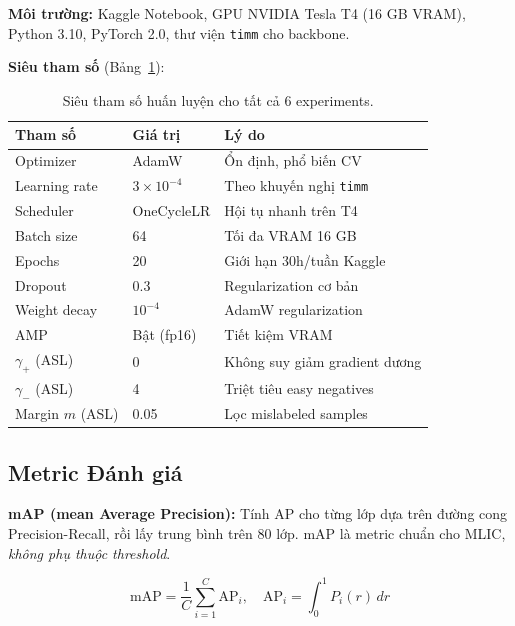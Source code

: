\documentclass[conference]{IEEEtran}
\begin{document}
\textbf{Môi trường:} Kaggle Notebook, GPU NVIDIA Tesla T4 (16 GB VRAM),
Python 3.10, PyTorch 2.0, thư viện \texttt{timm} cho backbone.

\textbf{Siêu tham số} (Bảng~\ref{tab:hyperparams}):

\begin{table}[t]
  \caption{Siêu tham số huấn luyện cho tất cả 6 experiments.}
  \label{tab:hyperparams}
  \centering
  \begin{tabular}{lll}
    \toprule
    \textbf{Tham số} & \textbf{Giá trị} & \textbf{Lý do} \\
    \midrule
    Optimizer        & AdamW            & Ổn định, phổ biến CV \\
    Learning rate    & $3 \times 10^{-4}$ & Theo khuyến nghị \texttt{timm} \\
    Scheduler        & OneCycleLR       & Hội tụ nhanh trên T4 \\
    Batch size       & 64               & Tối đa VRAM 16 GB \\
    Epochs           & 20               & Giới hạn 30h/tuần Kaggle \\
    Dropout          & 0.3              & Regularization cơ bản \\
    Weight decay     & $10^{-4}$        & AdamW regularization \\
    AMP              & Bật (fp16)       & Tiết kiệm VRAM \\
    $\gamma_+$ (ASL) & 0                & Không suy giảm gradient dương \\
    $\gamma_-$ (ASL) & 4                & Triệt tiêu easy negatives \\
    Margin $m$ (ASL) & 0.05             & Lọc mislabeled samples \\
    \bottomrule
  \end{tabular}
\end{table}

\subsection{Metric Đánh giá}

\textbf{mAP (mean Average Precision):}
Tính AP cho từng lớp dựa trên đường cong Precision-Recall,
rồi lấy trung bình trên 80 lớp.
mAP là metric chuẩn cho MLIC, \textit{không phụ thuộc threshold}.

\begin{equation}
  \text{mAP} = \frac{1}{C}\sum_{i=1}^{C} \text{AP}_i,
  \quad \text{AP}_i = \int_0^1 P_i(r)\, dr
  \label{eq:map}
\end{equation}
\end{document}
